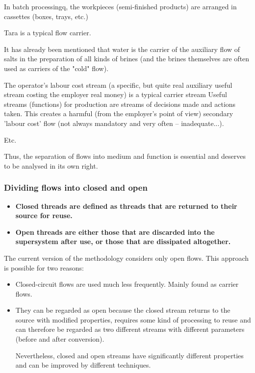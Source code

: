 \documentclass[a4paper,11pt]{article}
\begin{document}
In batch processingq, the workpieces (semi-finished products) are arranged in cassettes (boxes, trays, etc.)

Tara is a typical flow carrier.

It has already been mentioned that water is the carrier of the auxiliary flow
of salts in the preparation of all kinds of brines (and the brines themselves
are often used as carriers of the "cold" flow).

The operator's labour cost stream (a specific, but quite real auxiliary useful
stream costing the employer real money) is a typical carrier stream Useful
streams (functions) for production are streams of decisions made and actions
taken. This creates a harmful (from the employer's point of view) secondary
'labour cost' flow (not always mandatory and very often -- inadequate...).

Etc.

Thus, the separation of flows into medium and function is essential and
deserves to be analysed in its own right.

\subsubsection{Dividing flows into closed and open}
\begin{itemize}
\item \textbf{Closed threads are defined as threads that are returned to their
  source for reuse.}
\item \textbf{Open threads are either those that are discarded into the
  supersystem after use, or those that are dissipated altogether.}
\end{itemize}
The current version of the methodology \cite{B9} considers only open flows.
This approach is possible for two reasons:
\begin{itemize}
\item Closed-circuit flows are used much less frequently. Mainly found as
  carrier flows.
\item They can be regarded as open because the closed stream returns to the
  source with modified properties, requires some kind of processing to reuse
  and can therefore be regarded as two different streams with different
  parameters (before and after conversion).

  Nevertheless, closed and open streams have significantly different
  properties and can be improved by different techniques.
\end{itemize}
\end{document}
